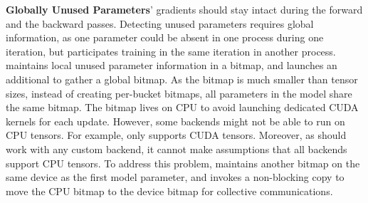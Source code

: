 \textbf{Globally Unused Parameters}' gradients should stay intact during the forward and the backward passes. Detecting unused parameters requires global information, as one parameter could be absent in one  process during one iteration, but participates training in the same iteration in another process.  maintains local unused parameter information in a bitmap, and launches an additional  to gather a global bitmap. As the bitmap is much smaller than tensor sizes, instead of creating per-bucket bitmaps, all parameters in the model share the same bitmap. The bitmap lives on CPU to avoid launching dedicated CUDA kernels for each update. However, some  backends might not be able to run  on CPU tensors. For example,  only supports CUDA tensors. Moreover, as  should work with any custom  backend, it cannot make assumptions that all backends support CPU tensors. To address this problem,  maintains another bitmap on the same device as the first model parameter, and invokes a non-blocking copy to move the CPU bitmap to the device bitmap for collective communications. 
